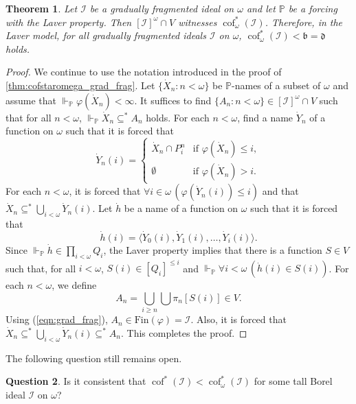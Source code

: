 \documentclass[a4paper,12pt]{amsart}
\newtheorem{thm}{Theorem}
\theoremstyle{definition}
\newtheorem{que}[thm]{Question}
\numberwithin{thm}{section}
\numberwithin{equation}{section}
\newcommand{\bb}{\mathfrak{b}}
\newcommand{\dd}{\mathfrak{d}}
\DeclareMathOperator{\cof}{cof}
\newcommand{\forces}{\Vdash}
\newcommand{\I}{\mathscr{I}}
\renewcommand{\subset}{\subseteq}
\begin{document}
    \begin{thm}\label{thm:grad_frag_in_Laver}
        Let $\I$ be a gradually fragmented ideal on $\omega$ and let $\mathbb{P}$ be a forcing with the Laver property. Then $[\I]^\omega\cap V$ witnesses $\cof^*_\omega(\I)$. Therefore, in the Laver model, for all gradually fragmented ideals $\I$ on $\omega$, $\cof^*_\omega(\I) < \bb = \dd$ holds.
    \end{thm}
    \begin{proof}
        We continue to use the notation introduced in the proof of \cref{thm:cofstaromega_grad_frag}. Let $\{\dot{X}_n: n<\omega\}$ be $\mathbb{P}$-names of a subset of $\omega$ and assume that $\forces_{\mathbb{P}}\varphi(\dot{X}_n)<\infty$. It suffices to find $\{A_n\colon n<\omega\}\in [\I]^\omega\cap V$ such that for all $n<\omega$, $\forces_{\mathbb{P}}\dot{X}_n\subset^* A_n$ holds.
        For each $n < \omega$, find a name $\dot{Y}_n$ of a function on $\omega$ such that it is forced that
        \[
        \dot{Y}_n(i) =
        \begin{cases}
            \dot{X}_n \cap P^n_i & \text{if }\varphi(\dot{X}_n) \leq i,\\
            \emptyset & \text{if }\varphi(\dot{X}_n) > i.
        \end{cases}
        \]
        For each $n<\omega$, it is forced that $\forall i\in\omega\,(\varphi(\dot{Y}_n(i)) \leq i)$ and that $\dot{X}_n\subset^*\bigcup_{i<\omega}\dot{Y}_n(i)$. Let $\dot{h}$ be a name of a function on $\omega$ such that it is forced that
        \[
        \dot{h}(i) = \langle\dot{Y}_0(i), \dot{Y}_1(i), \ldots, \dot{Y}_i(i)\rangle.
        \]
        Since $\forces_{\mathbb{P}} \dot{h}\in\prod_{i<\omega}Q_i$, the Laver property implies that there is a function $S \in V$ such that, for all $i<\omega$, $S(i)\in [Q_i]^{\leq i}$ and $\forces_{\mathbb{P}}\forall i<\omega\,(\dot{h}(i)\in S(i))$. For each $n<\omega$, we define
        \[
        A_n = \bigcup_{i\geq n}\bigcup\pi_n[S(i)]\in V.
        \]
        Using (\ref{eqn:grad_frag}), $A_n\in \mathrm{Fin}(\varphi) = \I$. Also, it is forced that $\dot{X}_n\subset^* \bigcup_{i<\omega} \dot{Y}_n(i) \subset^* A_n$. This completes the proof.
    \end{proof}

    The following question still remains open.

    \begin{que}\label{que_cof_cof_omega}
        Is it consistent that $\cof^*(\I) < \cof^*_\omega(\I)$ for some tall Borel ideal $\I$ on $\omega$?
    \end{que}
    
\end{document}
